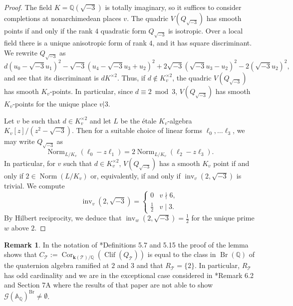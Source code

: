 \documentclass[12pt, reqno]{amsart}
\theoremstyle{definition}
\newtheorem{rmk}[lemma]{Remark}
\newcommand{\A}{{\mathbb A}}
\newcommand{\Q}{{\mathbb Q}}
\newcommand{\kk}{{\mathbf k}}
\newcommand{\calG}{{\mathcal G}}
\newcommand{\scrT}{{\mathscr T}}
\DeclareMathOperator{\inv}{inv}
\DeclareMathOperator{\Cor}{Cor}
\DeclareMathOperator{\Norm}{Norm}
\DeclareMathOperator{\Br}{Br}
\DeclareMathOperator{\Clif}{Clif}
\begin{document}
\begin{proof}
   The field \(K= \Q({\sqrt{-3}})\) is totally imaginary, so it suffices to consider completions at nonarchimedean places \(v\).
	The quadric $V(Q_{\sqrt{-3}})$ has smooth points if and only if the rank $4$ quadratic form $Q_{\sqrt{-3}}$ is isotropic. Over a local field there is a unique anisotropic form of rank $4$, and it has square discriminant.
   We rewrite \(Q_{{\sqrt{-3}}}\) as
   \[
      d(u_0 - {\sqrt{-3}} u_1)^2 - {\sqrt{-3}}\left(u_4 -{\sqrt{-3}} u_3 + u_2\right)^2 + 2{\sqrt{-3}}\left({\sqrt{-3}} u_3 - u_2\right)^2 - 2({\sqrt{-3}} u_2)^2,
   \]
   and see that its discriminant is \(dK^{\times2}\). Thus, if \(d\not\in K_v^{\times2}\), the quadric \(V(Q_{{\sqrt{-3}}})\) has smooth \(K_v\)-points.  In particular, since \(d\equiv 2 \bmod 3\), \(V(Q_{{\sqrt{-3}}})\) has smooth \(K_v\)-points for the unique place \(v|3\).
   
   Let \(v\) be such that \(d \in K_v^{\times 2}\) and let \(L\) be the \'etale $K_v$-algebra \(K_v[z]/(z^2 - {\sqrt{-3}})\). Then for a suitable choice of linear forms \(\ell_0, \dots \ell_3\), we may write \(Q_{{\sqrt{-3}}}\) as
   \[
      \Norm_{L/K_v}(\ell_0 - {z}\ell_1) = 2\Norm_{L/K_v}(\ell_2 -{z}\ell_3).
   \]
   In particular, for $v$ such that \(d\in K_v^{\times2}\), \(V(Q_{{\sqrt{-3}}})\) has a smooth \(K_v\) point if and only if \(2 \in \Norm(L/K_v)\) or, equivalently, if and only if \({\inv_v}(2, {\sqrt{-3}})\) is trivial. We compute
   \[
      {\inv_v}(2,{\sqrt{-3}}) = \begin{cases}
         0 & v\nmid 6,\\
         \frac12 & v \mid 3.
      \end{cases}
   \]
   By Hilbert reciprocity, we deduce that \(\inv_w(2,{\sqrt{-3}}) = \frac12\) for the unique prime $w$ above $2$.
   \end{proof}

\begin{rmk}
	In the notation of \cite{CV}*{Definitions 5.7 and 5.15} the proof of the lemma shows that $C_\scrT := \Cor_{\kk(\scrT)/\Q}(\Clif(Q_\scrT))$ is equal to the class in $\Br(\Q)$ of the quaternion algebra ramified at $2$ and $3$ and that $R_\scrT = \{ 2 \}$. In particular, $R_\scrT$ has odd cardinality and we are in the exceptional case considered in \cite{CV}*{Remark 6.2 and Section 7A} where the results of that paper are not able to show $\calG(\A_\Q)^{\Br} \ne \emptyset$. 
\end{rmk}
\end{document}
